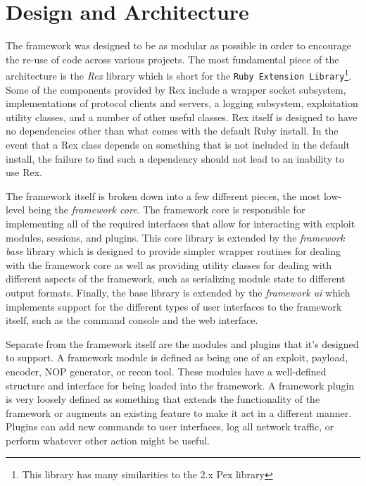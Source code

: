 \documentclass{report}
\begin{document}
    \section{Design and Architecture}

\par
The framework was designed to be as modular as possible in order to
encourage the re-use of code across various projects.  The most
fundamental piece of the architecture is the \textit{Rex} library
which is short for the \texttt{Ruby Extension Library}\footnote{This
library has many similarities to the 2.x Pex library}. Some of the
components provided by Rex include a wrapper socket subsystem,
implementations of protocol clients and servers, a logging
subsystem, exploitation utility classes, and a number of other
useful classes.  Rex itself is designed to have no dependencies
other than what comes with the default Ruby install. In the event
that a Rex class depends on something that is not included in the
default install, the failure to find such a dependency should not
lead to an inability to use Rex.

\par
The framework itself is broken down into a few different pieces, the
most low-level being the \textit{framework core}.  The framework
core is responsible for implementing all of the required interfaces
that allow for interacting with exploit modules, sessions, and
plugins. This core library is extended by the \textit{framework
base} library which is designed to provide simpler wrapper routines
for dealing with the framework core as well as providing utility
classes for dealing with different aspects of the framework, such as
serializing module state to different output formats.  Finally, the
base library is extended by the \textit{framework ui} which
implements support for the different types of user interfaces to the
framework itself, such as the command console and the web interface.

\par
Separate from the framework itself are the modules and plugins that
it's designed to support.  A framework module is defined as being
one of an exploit, payload, encoder, NOP generator, or recon tool.
These modules have a well-defined structure and interface for being
loaded into the framework.  A framework plugin is very loosely
defined as something that extends the functionality of the framework
or augments an existing feature to make it act in a different
manner. Plugins can add new commands to user interfaces, log all
network traffic, or perform whatever other action might be useful.
\end{document}
